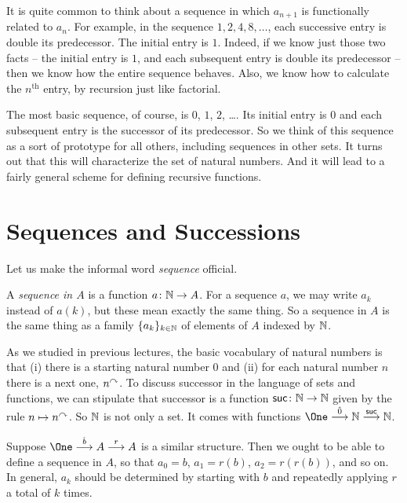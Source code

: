 It is quite common to think about a sequence in which $a_{n+1}$ is functionally related to $a_n$. 
For example, in the sequence $1, 2, 4, 8,\ldots$, each successive entry is double its predecessor. 
The initial entry is $1$. 
Indeed, if we know just those two facts -- the initial entry is $1$, and each subsequent entry is double its predecessor -- then we know how the entire sequence behaves.
Also, we know how to calculate the $n^{\text{th}}$ entry, by recursion just like factorial.

The most basic sequence, of course, is $0$, $1$, $2$, \ldots. 
Its initial entry is $0$ and each subsequent entry is the successor of its predecessor. 
So we think of this sequence as a sort of prototype for all others, including sequences in other sets. 
It turns out that this will characterize the set of natural numbers. And it will lead to a fairly general scheme for defining recursive functions.

\section{Sequences and Successions}

Let us make the informal word \emph{sequence} official.

\begin{defn}
	A \emph{sequence in $A$} is a function ${a}\colon{\mathbb N}\to{A}$. For a sequence $a$, we may write $a_k$ instead of $a(k)$, but these mean exactly the same thing.
	So a sequence in $A$ is the same thing as a family $\{a_k\}_{k\in\mathbb N}$ of elements of $A$ indexed by $\mathbb N$.
\end{defn}

As we studied in previous lectures, the basic vocabulary of natural numbers is that (i) there is a starting natural number $0$ and (ii) for each natural number $n$ there is a next one, $n^\curvearrowright$. 
To discuss successor in the language of sets and functions, we can stipulate that successor is a function ${\mathord{\textsf{suc}}}\colon{\mathbb N}\to{\mathbb N}$ given by the rule $n\mapsto n^\curvearrowright$.
So $\mathbb N$ is not only a set. 
It comes with functions $\One \stackrel{\hat{0}}{\longrightarrow} \NN \stackrel{\suc}{\longrightarrow} \NN$.

Suppose $\One\stackrel{\hat{b}}{\longrightarrow}A\stackrel{r}{\longrightarrow}A$ is a similar structure.
Then we ought to be able to define a sequence in $A$, so that $a_0=b$, $a_1=r(b)$, $a_2=r(r(b))$, and so on. 
In general, $a_k$ should be determined by starting with $b$ and repeatedly applying $r$ a total of $k$ times. 

